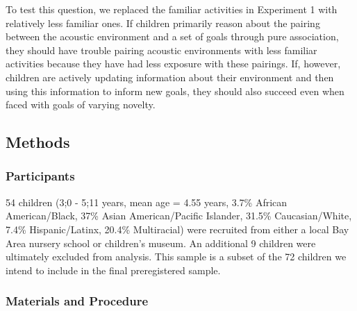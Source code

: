 \documentclass[10pt, letterpaper]{article}
\begin{document}
To test this question, we replaced the familiar activities in Experiment
1 with relatively less familiar ones. If children primarily reason about
the pairing between the acoustic environment and a set of goals through
pure association, they should have trouble pairing acoustic environments
with less familiar activities because they have had less exposure with
these pairings. If, however, children are actively updating information
about their environment and then using this information to inform new
goals, they should also succeed even when faced with goals of varying
novelty.

\hypertarget{methods-1}{%
\subsection{Methods}\label{methods-1}}

\hypertarget{participants-1}{%
\subsubsection{Participants}\label{participants-1}}

54 children (3;0 - 5;11 years, mean age = 4.55 years, 3.7\% African
American/Black, 37\% Asian American/Pacific Islander, 31.5\%
Caucasian/White, 7.4\% Hispanic/Latinx, 20.4\% Multiracial) were
recruited from either a local Bay Area nursery school or children's
museum. An additional 9 children were ultimately excluded from analysis.
This sample is a subset of the 72 children we intend to include in the
final preregistered sample.

\hypertarget{materials-and-procedure-1}{%
\subsubsection{Materials and
Procedure}\label{materials-and-procedure-1}}
\end{document}
